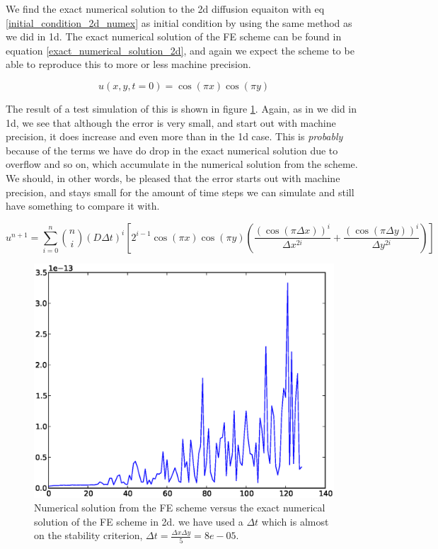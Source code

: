 We find the exact numerical solution to the 2d diffusion equaiton with eq \ref{initial_condition_2d_numex} as initial condition by using the same method as we did in 1d. 
The exact numerical solution of the FE scheme can be found in equation \ref{exact_numerical_solution_2d}, and again we expect the scheme to be able to reproduce this to more or less machine precision. 

\begin{equation}\label{initial_condition_2d_numex}
 u(x,y,t=0) = \cos(\pi x)\cos(\pi y)
\end{equation}

The result of a test simulation of this is shown in figure \ref{exact_numerical_2d_n130}. 
Again, as in we did in 1d, we see that although the error is very small, and start out with machine precision, it does increase and even more than in the 1d case. 
This is \emph{probably} because of the terms we have do drop in the exact numerical solution due to overflow and so on, which accumulate in the numerical solution from the scheme. 
We should, in other words, be pleased that the error starts out with machine precision, and stays small for the amount of time steps we can simulate and still have something to compare it with.

\begin{equation}\label{exact_numerical_solution_2d}
 u^{n+1} = \sum\limits^n_{i=0}{n\choose i}\left(D\Delta t\right)^i\left[2^{i-1}\cos(\pi x)\cos(\pi y)\left(\frac{(\cos(\pi\Delta x))^i}{\Delta x^{2i}} +\frac{(\cos(\pi\Delta y))^i}{\Delta y^{2i}}\right)\right]
\end{equation}

\begin{figure}[H]
 \centering
 \includegraphics[scale=0.7]{Figures/exact_numerical_2d_n130.eps}
 \caption{Numerical solution from the FE scheme versus the exact numerical solution of the FE scheme in 2d. we have used a $\Delta t$ which is almost on the stability criterion, $\Delta t = \frac{\Delta x \Delta y}{5} = 8e-05$.}
 \label{exact_numerical_2d_n130}
\end{figure}

